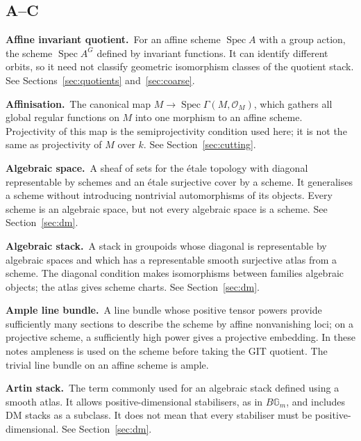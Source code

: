 \documentclass[11pt,a4paper]{article}
\numberwithin{equation}{section}
\theoremstyle{definition}
\newcommand{\Gm}{\mathbb G_m}
\newcommand{\OO}{\mathcal O}
\newcommand{\Spec}{\operatorname{Spec}}
\begin{document}
\newcommand{\glossentry}[2]{\par\smallskip\noindent\textbf{#1.}\ #2\par}

\subsection*{A--C}

\glossentry{Affine invariant quotient}{For an affine scheme $\Spec A$
with a group action, the scheme $\Spec A^G$ defined by invariant functions.
It can identify different orbits, so it need not classify geometric
isomorphism classes of the quotient stack. See
Sections~\ref{sec:quotients} and~\ref{sec:coarse}.}

\glossentry{Affinisation}{The canonical map
$M\to\Spec\Gamma(M,\OO_M)$, which gathers all global regular functions
on $M$ into one morphism to an affine scheme. Projectivity of this map
is the semiprojectivity condition used here; it is not the same as
projectivity of $M$ over $k$. See Section~\ref{sec:cutting}.}

\glossentry{Algebraic space}{A sheaf of sets for the étale topology with
diagonal representable by schemes and an étale surjective cover by a
scheme. It generalises a scheme without introducing nontrivial
automorphisms of its objects. Every scheme is an algebraic space, but
not every algebraic space is a scheme. See Section~\ref{sec:dm}.}

\glossentry{Algebraic stack}{A stack in groupoids whose diagonal is
representable by algebraic spaces and which has a representable smooth
surjective atlas from a scheme. The diagonal condition makes
isomorphisms between families algebraic objects; the atlas gives
scheme charts. See Section~\ref{sec:dm}.}

\glossentry{Ample line bundle}{A line bundle whose positive tensor powers
provide sufficiently many sections to describe the scheme by affine
nonvanishing loci; on a projective scheme, a sufficiently high power
gives a projective embedding. In these notes ampleness is used on the
scheme before taking the GIT quotient. The trivial line bundle on an
affine scheme is ample.}

\glossentry{Artin stack}{The term commonly used for an algebraic stack
defined using a smooth atlas. It allows positive-dimensional stabilisers,
as in $B\Gm$, and includes DM stacks as a subclass. It does not mean
that every stabiliser must be positive-dimensional. See Section~\ref{sec:dm}.}
\end{document}
